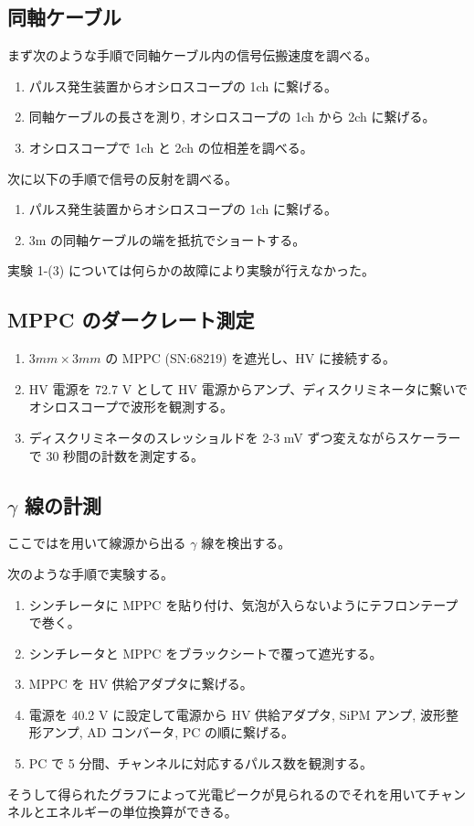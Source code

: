 \documentclass[uplatex,dvipdfmx,a4paper,11pt]{jlreq}
\numberwithin{equation}{section}
\theoremstyle{definition}
\begin{document}
\subsection{同軸ケーブル}
まず次のような手順で同軸ケーブル内の信号伝搬速度を調べる。
\begin{enumerate}
  \item パルス発生装置からオシロスコープの 1ch に繋げる。
  \item 同軸ケーブルの長さを測り, オシロスコープの 1ch から 2ch に繋げる。
  \item オシロスコープで 1ch と 2ch の位相差を調べる。
\end{enumerate}
次に以下の手順で信号の反射を調べる。
\begin{enumerate}
  \item パルス発生装置からオシロスコープの 1ch に繋げる。
  \item 3\si{m} の同軸ケーブルの端を抵抗でショートする。
\end{enumerate}
実験 1-(3) については何らかの故障により実験が行えなかった。


\subsection{MPPC のダークレート測定}
\begin{enumerate}
  \item $3\si{mm}\times 3\si{mm}$ の MPPC (SN:68219) を遮光し、HV に接続する。
  \item HV 電源を 72.7 \si{V} として HV 電源からアンプ、ディスクリミネータに繋いでオシロスコープで波形を観測する。
  \item ディスクリミネータのスレッショルドを 2-3 \si{mV} ずつ変えながらスケーラーで 30 秒間の計数を測定する。
\end{enumerate}


\subsection{$\gamma$ 線の計測}
ここではを用いて線源から出る $\gamma$ 線を検出する。

次のような手順で実験する。
\begin{enumerate}
  \item シンチレータに MPPC を貼り付け、気泡が入らないようにテフロンテープで巻く。
  \item シンチレータと MPPC をブラックシートで覆って遮光する。
  \item MPPC を HV 供給アダプタに繋げる。
  \item 電源を 40.2 V に設定して電源から HV 供給アダプタ, SiPM アンプ, 波形整形アンプ, AD コンバータ, PC の順に繋げる。
  \item PC で 5 分間、チャンネルに対応するパルス数を観測する。
\end{enumerate}
そうして得られたグラフによって光電ピークが見られるのでそれを用いてチャンネルとエネルギーの単位換算ができる。
\end{document}
